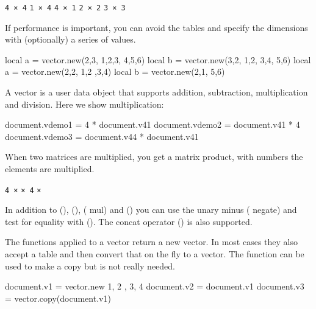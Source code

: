 \startlinecorrection
{} {\hbox{\tt 4 × 4}}
    {} {\hbox{\tt 1 × 4}}
    {} {\hbox{\tt 4 × 1}}
    {} {\hbox{\tt 2 × 2}}
    {} {\hbox{\tt 3 × 3}}
\stopcombination
\stoplinecorrection

If performance is important, you can avoid the tables and specify the dimensions
with (optionally) a series of values.

\starttyping
local a = vector.new(2,3, 1,2,3, 4,5,6)
local b = vector.new(3,2, 1,2, 3,4, 5,6)
local a = vector.new(2,2, 1,2 ,3,4)
local b = vector.new(2,1, 5,6)
\stoptyping

A vector is a user data object that supports addition, subtraction,
multiplication and division. Here we show multiplication:

\startbuffer
\startluacode
document.vdemo1 = 4 * document.v41
document.vdemo2 = document.v41 * 4
document.vdemo3 = document.v44 * document.v41
\stopluacode
\stopbuffer

\typebuffer[option=TEX] \getbuffer

When two matrices are multiplied, you get a matrix product, with numbers the
elements are multiplied.

\startlinecorrection
{} {}
    {} {\hbox{\tt 4 ×}}
    {} {\hbox{\tt × 4}}
    {} {\hbox{\tt ×  }}
\stopcombination
\stoplinecorrection

In addition to \type {+} (), \type {-} (), \type {*} (\type
{mul}) and \type {/} () you can use the unary minus \type {-} (\type
{negate}) and test for equality with \type {=} (). The concat
operator  () is also supported.

The functions applied to a vector return a new vector. In most cases they also
accept a table and then convert that on the fly to a vector. The 
function can be used to make a copy but is not really needed.

\startbuffer
\startluacode
document.v1 = vector.new { { 1, 2 }, { 3, 4 } }
document.v2 = document.v1
document.v3 = vector.copy(document.v1)
\stopluacode
\stopbuffer

